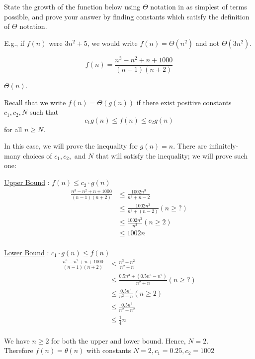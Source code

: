 \begin{prob}
    State the growth of the function below using $\Theta$ notation in as
    simplest of terms possible, and prove your answer by finding constants
    which satisfy the definition of $\Theta$ notation.

    E.g., if $f(n)$ were $3n^2 + 5$, we would write $f(n) = \Theta(n^2)$ and not $\Theta(3n^2)$.

    \[
        f(n) = \frac{n^3 - n^2 + n + 1000}{(n-1)(n+2)}
    \]
    
    \begin{soln}
        $\Theta(n)$.

        Recall that we write $f(n) = \Theta(g(n))$ if there exist positive constants $c_1, c_2, N$
        such that
        \[
            c_1 g(n) \leq f(n) \leq c_2 g(n)
        \]
        for all $n \geq N$.

        In this case, we will prove the inequality for $g(n) = n$. There are infinitely-many choices
        of $c_1, c_2, $ and $N$ that will satisfy the inequality; we will prove such one:

        \underline{Upper Bound} :  $f(n) \leq c_2 \cdot g(n)$ \\

        \begin{align*}
        \frac{n^3-n^2 + n + 1000}{(n-1)(n+2)}
        & \le \frac{1002n^3}{n^2 + n - 2}\\
        & \le \frac{1002n^3}{n^2 + (n - 2)} (n \ge ?) \\
        & \le \frac{1002n^3}{n^2} (n \ge 2) \\
        & \le 1002n \\
        \end{align*}


        \underline{Lower Bound} : $c_1 \cdot g(n) \leq f(n)$ \\

        \begin{align*}
        \frac{n^3-n^2 + n + 1000}{(n-1)(n+2)}
        & \le \frac{n^3-n^2}{n^2 + n}\\
        & \le \frac{0.5n^3 + (0.5n^3 -n^2)}{n^2 + n} (n \ge ?) \\
        & \le \frac{0.5n^3}{n^2 + n} (n \ge 2) \\
        & \le \frac{0.5n^3}{n^2 + n^2} \\
        & \le \frac{1}{4}n \\
        \end{align*}

        We have $n \ge 2 $ for both the upper and lower bound. Hence, $N=2$. \\
        Therefore $f(n) = \theta(n)$ with constants $N=2, c_1 = 0.25, c_2 = 1002$
    \end{soln}
    
\end{prob}

